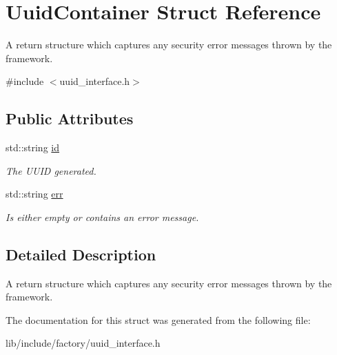 \hypertarget{structUuidContainer}{\section{Uuid\-Container Struct Reference}
\label{structUuidContainer}
}


A return structure which captures any security error messages thrown by the framework.  




{\ttfamily \#include $<$uuid\-\_\-interface.\-h$>$}

\subsection*{Public Attributes}
\begin{DoxyCompactItemize}
\item 
\hypertarget{structUuidContainer_aea2f6e3768858acb4086cd1a93c5666a}{std\-::string \hyperlink{structUuidContainer_aea2f6e3768858acb4086cd1a93c5666a}{id}}\label{structUuidContainer_aea2f6e3768858acb4086cd1a93c5666a}

\begin{DoxyCompactList}\small\item\em The U\-U\-I\-D generated. \end{DoxyCompactList}\item 
\hypertarget{structUuidContainer_a58e21d1df4638157e157a41fa95a5e07}{std\-::string \hyperlink{structUuidContainer_a58e21d1df4638157e157a41fa95a5e07}{err}}\label{structUuidContainer_a58e21d1df4638157e157a41fa95a5e07}

\begin{DoxyCompactList}\small\item\em Is either empty or contains an error message. \end{DoxyCompactList}\end{DoxyCompactItemize}


\subsection{Detailed Description}
A return structure which captures any security error messages thrown by the framework. 

The documentation for this struct was generated from the following file\-:\begin{DoxyCompactItemize}
\item 
lib/include/factory/uuid\-\_\-interface.\-h\end{DoxyCompactItemize}
